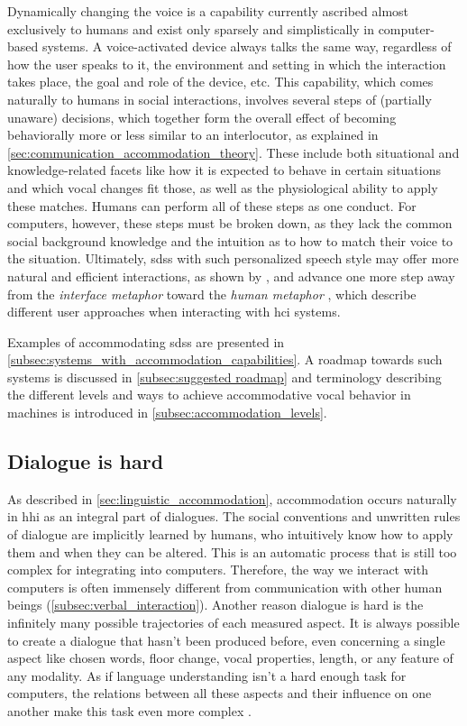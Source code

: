 Dynamically changing the voice is a capability currently ascribed almost exclusively to humans and exist only sparsely and simplistically in computer-based systems.
A voice-activated device always talks the same way, regardless of how the user speaks to it, the environment and setting in which the interaction takes place, the goal and role of the device, etc.
This capability, which comes naturally to humans in social interactions, involves several steps of (partially unaware) decisions, which together form the overall effect of becoming behaviorally more or less similar to an interlocutor, as explained in \cref{sec:communication_accommodation_theory}.
These include both situational and knowledge-related facets like how it is expected to behave in certain situations and which vocal changes fit those, as well as the physiological ability to apply these matches.
Humans can perform all of these steps as one conduct.
For computers, however, these steps must be broken down, as they lack the common social background knowledge and the intuition as to how to match their voice to the situation.
Ultimately, \Acp{sds} with such personalized speech style may offer more natural and efficient interactions, as shown by \citet{Porzel2006entrainment}, and advance one more step away from the \emph{interface metaphor} \citep{Edlund2006twofaces} toward the \emph{human metaphor} \citep{Carlson2006humanlike}, which describe different user approaches when interacting with \ac{hci} systems.

Examples of accommodating \acp{sds} are presented in \cref{subsec:systems_with_accommodation_capabilities}.
A roadmap towards such systems is discussed in \cref{subsec:suggested roadmap} and terminology describing the different levels and ways to achieve accommodative vocal behavior in machines is introduced in \cref{subsec:accommodation_levels}.

\subsection{Dialogue is hard}
\label{subsec:dialogue_is_hard}

As described in \cref{sec:linguistic_accommodation}, accommodation occurs naturally in \ac{hhi} as an integral part of dialogues.
The social conventions and unwritten rules of dialogue are implicitly learned by humans, who intuitively know how to apply them and when they can be altered.
This is an automatic process that is still too complex for integrating into computers.
Therefore, the way we interact with computers is often immensely different from communication with other human beings (\cref{subsec:verbal_interaction}).
Another reason dialogue is hard is the infinitely many possible trajectories of each measured aspect.
It is always possible to create a dialogue that hasn't been produced before, even concerning a single aspect like chosen words, floor change, vocal properties, length, or any feature of any modality.
As if language understanding isn't a hard enough task for computers, the relations between all these aspects and their influence on one another make this task even more complex \citep[and see][]{Gordon2018evaluating}.

